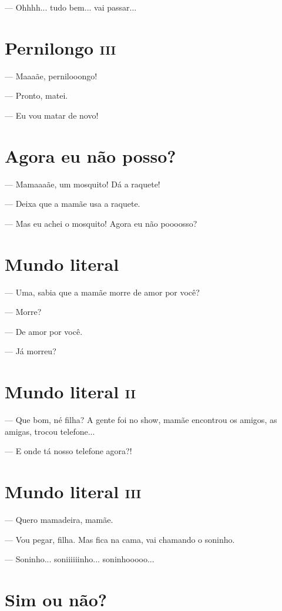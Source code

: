 — Ohhhh... tudo bem... vai passar...

\chapter{Pernilongo \textsc{iii}}

— Maaaãe, pernilooongo!

— Pronto, matei.

— Eu vou matar de novo!

\chapter{Agora eu não posso?}

— Mamaaaãe, um mosquito! Dá a raquete!

— Deixa que a mamãe usa a raquete.

— Mas eu achei o mosquito! Agora eu não poooosso?

\chapter{Mundo literal}

— Uma, sabia que a mamãe morre de amor por você?

— Morre?

— De amor por você.

— Já morreu?

\chapter{Mundo literal \textsc{ii}}

— Que bom, né filha? A gente foi no show, mamãe encontrou os amigos, as
amigas, trocou telefone...

— E onde tá nosso telefone agora?!

\chapter{Mundo literal \textsc{iii}}

— Quero mamadeira, mamãe.

— Vou pegar, filha. Mas fica na cama, vai chamando o soninho.

— Soninho... soniiiiiinho... soninhooooo...

\chapter{Sim ou não?}

